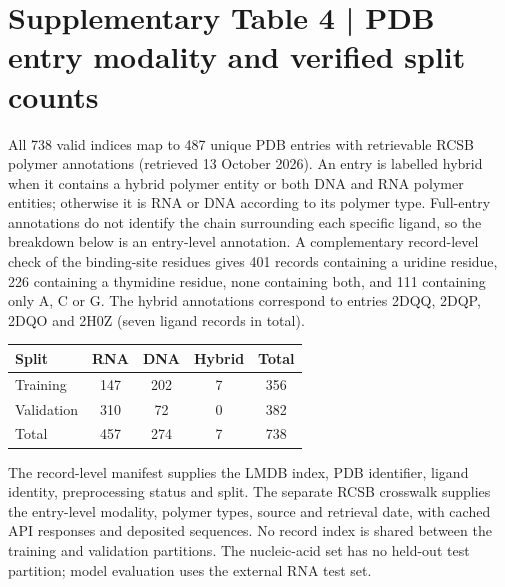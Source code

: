 \section*{Supplementary Table 4 | PDB entry modality and verified split counts}
All 738 valid indices map to 487 unique PDB entries with retrievable RCSB polymer annotations (retrieved 13 October 2026). An entry is labelled hybrid when it contains a hybrid polymer entity or both DNA and RNA polymer entities; otherwise it is RNA or DNA according to its polymer type. Full-entry annotations do not identify the chain surrounding each specific ligand, so the breakdown below is an entry-level annotation. A complementary record-level check of the binding-site residues gives 401 records containing a uridine residue, 226 containing a thymidine residue, none containing both, and 111 containing only A, C or G. The hybrid annotations correspond to entries 2DQQ, 2DQP, 2DQO and 2H0Z (seven ligand records in total).
\begin{center}\footnotesize
\begin{tabular}{@{}lcccc@{}}
\toprule
\textbf{Split} & \textbf{RNA} & \textbf{DNA} & \textbf{Hybrid} & \textbf{Total} \\
\midrule
Training   & 147 & 202 & 7 & 356 \\
Validation & 310 &  72 & 0 & 382 \\
\midrule
Total      & 457 & 274 & 7 & 738 \\
\bottomrule
\end{tabular}\end{center}
The record-level manifest supplies the LMDB index, PDB identifier, ligand identity, preprocessing status and split. The separate RCSB crosswalk supplies the entry-level modality, polymer types, source and retrieval date, with cached API responses and deposited sequences. No record index is shared between the training and validation partitions. The nucleic-acid set has no held-out test partition; model evaluation uses the external RNA test set.
